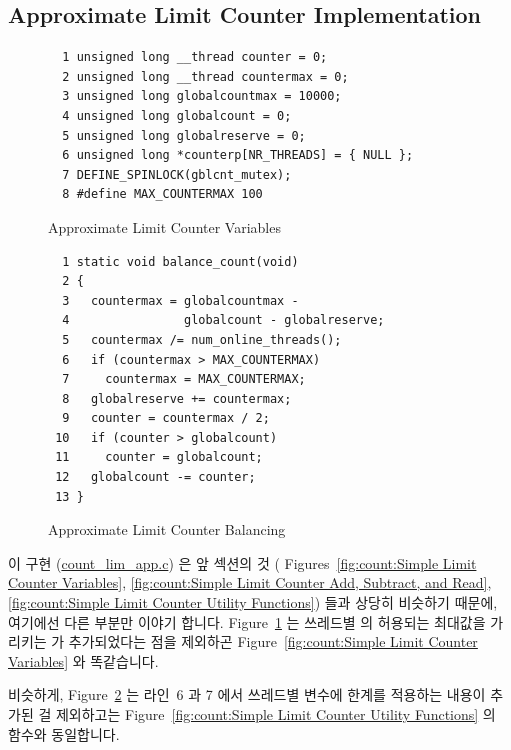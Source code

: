 \subsection{Approximate Limit Counter Implementation}
\label{sec:count:Approximate Limit Counter Implementation}

\begin{figure}[tbp]
{ \scriptsize
\begin{verbatim}
  1 unsigned long __thread counter = 0;
  2 unsigned long __thread countermax = 0;
  3 unsigned long globalcountmax = 10000;
  4 unsigned long globalcount = 0;
  5 unsigned long globalreserve = 0;
  6 unsigned long *counterp[NR_THREADS] = { NULL };
  7 DEFINE_SPINLOCK(gblcnt_mutex);
  8 #define MAX_COUNTERMAX 100
\end{verbatim}
}
\caption{Approximate Limit Counter Variables}
\label{fig:count:Approximate Limit Counter Variables}
\end{figure}

\begin{figure}[tbp]
{ \scriptsize
\begin{verbatim}
  1 static void balance_count(void)
  2 {
  3   countermax = globalcountmax -
  4                globalcount - globalreserve;
  5   countermax /= num_online_threads();
  6   if (countermax > MAX_COUNTERMAX)
  7     countermax = MAX_COUNTERMAX;
  8   globalreserve += countermax;
  9   counter = countermax / 2;
 10   if (counter > globalcount)
 11     counter = globalcount;
 12   globalcount -= counter;
 13 }
\end{verbatim}
}
\caption{Approximate Limit Counter Balancing}
\label{fig:count:Approximate Limit Counter Balancing}
\end{figure}

이 구현 (\url{count_lim_app.c}) 은 앞 섹션의 것 (
Figures~\ref{fig:count:Simple Limit Counter Variables},
\ref{fig:count:Simple Limit Counter Add, Subtract, and Read},
\ref{fig:count:Simple Limit Counter Utility Functions}) 들과 상당히 비슷하기
때문에, 여기에선 다른 부분만 이야기 합니다.
Figure~\ref{fig:count:Approximate Limit Counter Variables} 는 쓰레드별
 의 허용되는 최대값을 가리키는  가
추가되었다는 점을 제외하곤
Figure~\ref{fig:count:Simple Limit Counter Variables} 와 똑같습니다.

비슷하게,
Figure~\ref{fig:count:Approximate Limit Counter Balancing} 는 라인~6 과 7 에서
쓰레드별  변수에  한계를 적용하는 내용이
추가된 걸 제외하고는
Figure~\ref{fig:count:Simple Limit Counter Utility Functions} 의
 함수와 동일합니다.
\iffalse

